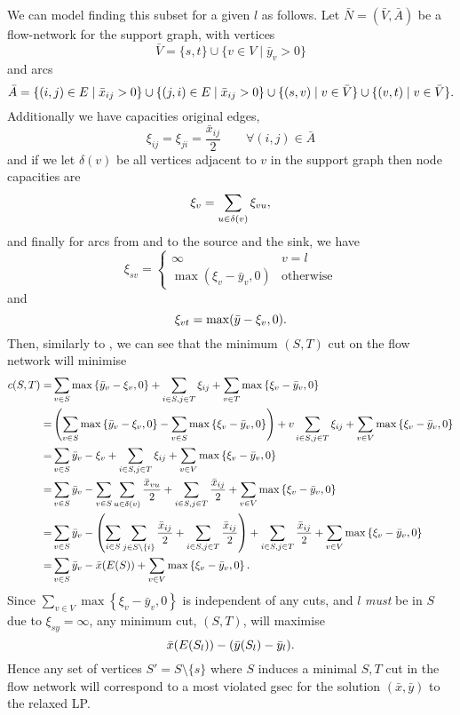   We can model finding this subset for a given $l$ as follows. Let $\bar{N} = (\bar{V}, \bar{A})$ be a flow-network
  for the support graph, with vertices
  $$\bar V = \{s, t\} \cup \{v \in V \mid \bar y_v > 0 \}$$
  and arcs
  $$\bar A = \{(i, j) \in E \mid \bar x_{ij} > 0 \} \cup \{(j, i) \in E \mid \bar x_{ij} > 0\} \cup \{(s, v) \mid v \in \bar V\} \cup \{(v, t) \mid v \in \bar V\}\mathnormal{.}$$
  Additionally we have capacities original edges,
  $$\xi_{ij} = \xi_{ji} = \frac{\bar x_{ij}}{2} \qquad \forall (i,j) \in \bar A$$
  and if we let $\delta (v)$ be all vertices adjacent to $v$ in the support graph then node capacities are
  $$\xi_v = \sum_{u \in \delta(v)} \xi_{vu}\mathnormal{,}$$
  and finally
  for arcs from and to the source and the sink, we have
  $$\xi_{sv} =
  \begin{cases}
    \infty & v = l \\
    \max(\xi_v - \bar y_v, 0) & \text{otherwise}
  \end{cases}$$
  and
  $$\xi_{vt} = \max(\bar y - \xi_v, 0)\mathnormal{.}$$
  Then, similarly to \citet{padberg1983trees}, we can see that
  the minimum $(S,T)$ cut on the flow network will minimise
  \begin{align*}
    c(S,T) = &\sum_{v \in S} \max \left\{\bar y_v - \xi_v, 0\right\} +
               \sum_{i \in S, j \in T} \xi_{ij} +
               \sum_{v \in T} \max\left\{\xi_v - \bar y_v, 0\right\} \\
    =&\left(\sum_{v \in S} \max \left\{\bar y_v - \xi_v, 0\right\} - \sum_{v \in S} \max\left\{\xi_v - \bar y_v, 0\right\} \right) +
v       \sum_{i \in S, j \in T}  \xi_{ij} +
       \sum_{v \in V} \max\left\{\xi_v - \bar y_v, 0\right\} \\
    =&\sum_{v \in S} \bar y_v - \xi_v +
       \sum_{i \in S, j \in T} \xi_{ij} +
       \sum_{v \in V} \max\left\{\xi_v - \bar y_v, 0\right\} \\
    =&\sum_{v \in S} \bar y_v -
       \sum_{v \in S} \sum_{u \in \delta(v)} \frac{\bar x_{vu}}{2} +
       \sum_{i \in S, j \in T} \frac{\bar x_{ij}}{2} +
       \sum_{v \in V} \max\left\{\xi_v - \bar y_v, 0\right\} \\
    =&\sum_{v \in S} \bar y_v -
       \left(\sum_{i \in S} \sum_{j \in S \setminus \{i\}} \frac{\bar x_{ij}}{2} +
       \sum_{i \in S, j \in T} \frac{\bar x_{ij}}{2}\right) +
       \sum_{i \in S, j \in T} \frac{\bar x_{ij}}{2} +
       \sum_{v \in V} \max\left\{\xi_v - \bar y_v, 0\right\} \\
    =&\sum_{v \in S} \bar y_v -
       \bar x (E(S)) +
       \sum_{v \in V} \max\left\{\xi_v - \bar y_v, 0\right\}\mathnormal{.}
  \end{align*}
  Since $\sum_{v \in V} \max\left\{\xi_v - \bar y_v, 0\right\}$ is independent of
  any cuts, and
  $l$ \textit{must} be in $S$ due to $\xi_{sy} = \infty$, any minimum cut, $(S,T)$, will maximise
  $$\bar x (E(S_l)) - (\bar y (S_l) - \bar y_l)\mathnormal{.}$$
  Hence any set of vertices $S' = S \setminus \{s\}$ where $S$ induces a minimal $S,T$ cut in the flow network will correspond to
  a most violated \gls{gsec} for the solution $(\bar x, \bar y)$ to the relaxed LP.

